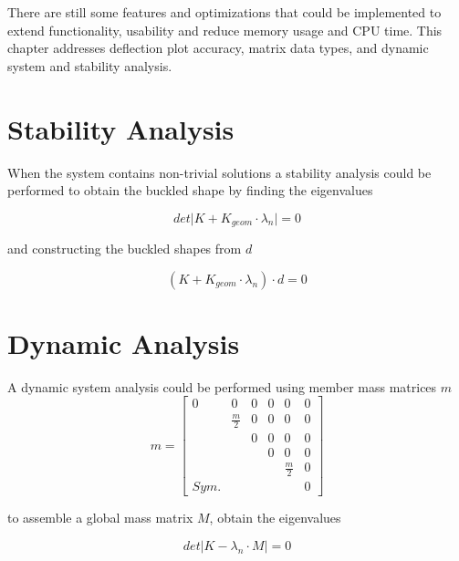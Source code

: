 There are still some features and optimizations that could be implemented to extend functionality, usability and reduce memory usage and CPU time.
This chapter addresses deflection plot accuracy, matrix data types, and dynamic system and stability analysis.

\section{Stability Analysis}
\label{sec:stabAna}

When the system contains non-trivial solutions a stability analysis could be performed to obtain the buckled shape by finding the eigenvalues

\begin{equation*} \label{eigenvalues}
det \lvert K + K_{geom} \cdot \lambda_n \lvert = 0 
\end{equation*}

and constructing the buckled shapes from $d$

\begin{equation*} \label{buckle}
( K + K_{geom} \cdot \lambda_n ) \cdot d = 0
\end{equation*}

\section{Dynamic Analysis}
\label{sec:dynAna}

A dynamic system analysis could be performed using member mass matrices $m$ 
\begin{equation} \label{strut3}
    m = \begin{bmatrix}
                   0 & 0		   & 0 & 0 & 0           & 0 \\
                     & \frac{m}{2} & 0 & 0 & 0           & 0 \\
                     &             & 0 & 0 & 0           & 0 \\
                     &             &   & 0 & 0           & 0 \\
                     &             &   &   & \frac{m}{2} & 0 \\
        Sym.         &             &   &   &             & 0
    \end{bmatrix}
\end{equation}

to assemble a global mass matrix $M$, obtain the eigenvalues

\begin{equation*} \label{eigenvalues2}
det \lvert K - \lambda_n \cdot M \lvert = 0 
\end{equation*}

